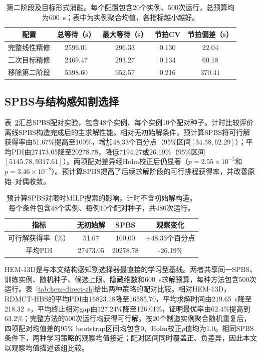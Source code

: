 \documentclass[final,5p,times,twocolumn]{elsarticle}
\newcommand{\method}{RDMCT-HBS}
\begin{document}
\begin{table}[!htbp]
\centering\scriptsize
\setlength{\tabcolsep}{3pt}
\caption{第二阶段及目标形式消融。每个配置包含20个实例、500次运行，总预算均为600~s；表中为实例聚合均值，各指标越小越好。}
\label{tab:refinement-ablation-zh}
\begin{tabular}{ccccc}
\toprule
配置 & 总等待（s） & 最大等待（s） & 节拍CV & 节拍偏差（s）\\
\midrule
完整线性精修 & 2596.01 & 296.33 & 0.130 & 22.04\\
二次目标精修 & 2469.47 & 293.27 & 0.134 & 60.18\\
移除第二阶段 & 5398.60 & 952.57 & 0.216 & 370.41\\
\bottomrule
\end{tabular}
\end{table}


\subsection{SPBS与结构感知割选择}

表~\ref{tab:spbs-zh-new}汇总SPBS配对实验，包含48个实例、每个实例10个配对种子。计时比较评价离线SPBS构造完成后的主求解性能。相对无初始解条件，预计算SPBS将可行解获得率由51.67\%提高至100\%，增加48.33个百分点（95\%区间$[34.58,62.29]$）；平均PDI由27473.05降至20278.78，降低7194.27或26.19\%（95\%区间$[5145.78,9317.61]$）。两项配对差异经Holm校正后仍显著（$p=2.55\times10^{-5}$和$p=3.46\times10^{-8}$）。预计算SPBS提高了后续求解阶段的可行排程获得率，并改善原始--对偶收敛。

\begin{table}[!htbp]
\centering
\scriptsize
\setlength{\tabcolsep}{3pt}
\caption{预计算SPBS对限时MILP搜索的影响，计时不含初始解构造。每个条件包含48个实例、每例10个配对种子，共480次运行。}
\label{tab:spbs-zh-new}
\begin{tabular}{cccc}
\toprule
指标 & 无初始解 & SPBS & 观察变化\\
\midrule
可行解获得率（\%） & 51.67 & 100.00 & +48.33个百分点\\
平均PDI & 27473.05 & 20278.78 & -26.19\%\\
\bottomrule
\end{tabular}
\end{table}

HEM-13D是与本文结构感知割选择器最直接的学习型基线。两者共享同一SPBS、训练实例、随机种子、候选上限、隐藏维数和600~s求解预算，每种方法包含500次运行。表~\ref{tab:hem-direct-zh}给出两种策略的配对比较。相对HEM-13D，\method{}的平均PDI由16823.18降至16585.70，平均求解时间由219.65~s降至218.32~s，平均终止相对gap由127.24\%降至126.01\%，证明最优率由62.4\%提高到63.2\%；完整方法的500次运行均获得可行解。按20个制造实例聚合随机重复后，四项配对均值差的95\% bootstrap区间均包含0，Holm校正$p$值均为1.0。相同SPBS条件下，两种学习策略的观察均值接近；配对区间同时覆盖正、负差异，因此本文以观察均值描述该组比较。
\end{document}
